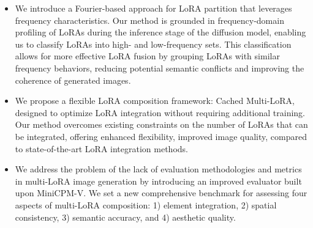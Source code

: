 \begin{itemize}[noitemsep, topsep=-8pt, leftmargin=*]
    \item We introduce a Fourier-based approach for LoRA partition that leverages frequency characteristics. Our method is grounded in frequency-domain profiling of LoRAs during the inference stage of the diffusion model, enabling us to classify LoRAs into high- and low-frequency sets. This classification allows for more effective LoRA fusion by grouping LoRAs with similar frequency behaviors, reducing potential semantic conflicts and improving the coherence of generated images.
    
    \item We propose a flexible LoRA composition framework: Cached Multi-LoRA, designed to optimize LoRA integration without requiring additional training. Our method overcomes existing constraints on the number of LoRAs that can be integrated, offering enhanced flexibility, improved image quality, compared to state-of-the-art LoRA integration methods.


    \item We address the problem of the lack of evaluation methodologies and metrics in multi-LoRA image generation by introducing an improved evaluator built upon MiniCPM-V. We set a new comprehensive benchmark for assessing four aspects of multi-LoRA composition: 1) element integration, 2) spatial consistency, 3) semantic accuracy, and 4) aesthetic quality.


\end{itemize}

